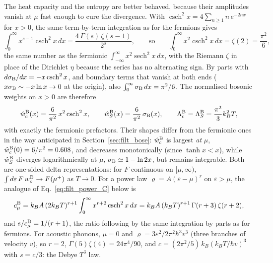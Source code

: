 \documentclass[10pt,a4paper]{article}
\theoremstyle{plain}
\theoremstyle{remark}
\begin{document}
The heat capacity and the entropy are better behaved, because their amplitudes
vanish at $ \mu $ fast enough to cure the divergence. With
$ \operatorname{csch}^{2}x = 4\sum_{n\geq1}n\,e^{-2nx} $ for $ x > 0 $, the same
term-by-term integration as for the fermions gives
\[
  \int_0^\infty x^{s-1}\operatorname{csch}^{2}x\,dx = \frac{4\,\Gamma(s)\,\zeta(s-1)}{2^{s}} ,
  \qquad\text{so}\qquad
  \int_0^\infty x^{2}\operatorname{csch}^{2}x\,dx = \zeta(2) = \frac{\pi^{2}}{6} ,
\]
the same number as the fermionic $ \int_{-\infty}^{\infty}x^{2}\operatorname{sech}^{2}x\,dx $,
with the Riemann $ \zeta $ in place of the Dirichlet $ \eta $ because the series has no
alternating sign. By parts with $ d\sigma_{\rm B}/dx = -x\operatorname{csch}^{2}x $, and
boundary terms that vanish at both ends ($ x\sigma_{\rm B} \sim -x\ln x \to 0 $ at the
origin), also $ \int_0^\infty\sigma_{\rm B}\,dx = \pi^{2}/6 $. The normalised bosonic
weights on $ x > 0 $ are therefore
\[
  \hat w^{\rm B}_c(x) = \frac{6}{\pi^{2}}\,x^{2}\operatorname{csch}^{2}x ,
  \qquad
  \hat w^{\rm B}_S(x) = \frac{6}{\pi^{2}}\,\sigma_{\rm B}(x) ,
  \qquad
  \Lambda^{\rm B}_c = \Lambda^{\rm B}_S = \frac{\pi^{2}}{3}k_B^{2}T ,
\]
with exactly the fermionic prefactors. Their shapes differ from the fermionic ones
in the way anticipated in Section~\ref{sec:filt_bose}: $ \hat w^{\rm B}_c $ is largest
\emph{at} $ \mu $, $ \hat w^{\rm B}_c(0) = 6/\pi^{2} = 0.608 $, and decreases
monotonically (since $ \tanh x < x $), while $ \hat w^{\rm B}_S $ diverges
logarithmically at $ \mu $, $ \sigma_{\rm B} \simeq 1 - \ln 2x $, but remains integrable.
Both are one-sided delta representations: for $ F $ continuous on $ [\mu, \infty) $,
$ \int d\varepsilon\,F\,w^{\rm B}_o \to F(\mu^{+}) $ as $ T \to 0 $. For a power law
$ \varrho = A(\varepsilon - \mu)^{r} $ on $ \varepsilon > \mu $, the analogue of
Eq.~\eqref{eq:filt_power_C} below is
\begin{equation}\label{eq:filt_power_CB}
  c^{\rm B}_\mu = k_BA\,(2k_BT)^{r+1}\int_0^\infty x^{r+2}\operatorname{csch}^{2}x\,dx
  = k_BA\,(k_BT)^{r+1}\,\Gamma(r+3)\,\zeta(r+2) ,
\end{equation}
and $ s/c^{\rm B}_\mu = 1/(r+1) $,
the ratio following by the same integration by parts as for fermions. For acoustic
phonons, $ \mu = 0 $ and $ \varrho = 3\varepsilon^{2}/2\pi^{2}\hbar^{3}v^{3} $ (three branches
of velocity $ v $), so $ r = 2 $, $ \Gamma(5)\zeta(4) = 24\pi^{4}/90 $, and
$ c = (2\pi^{2}/5)\,k_B(k_BT/\hbar v)^{3} $ with $ s = c/3 $: the Debye $ T^{3} $ law.
\end{document}
